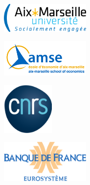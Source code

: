 \begin{center} %
	\begin{minipage}[c]{.23\linewidth}
		\centering\includegraphics[width=12em]{logo/amu.png} 
	\end{minipage}\hfill%
	\begin{minipage}[c]{.23\linewidth}
		\centering\includegraphics[width=12em]{logo/amse.png}
	\end{minipage}\hfill%
	\begin{minipage}[c]{.23\linewidth}
		\centering\includegraphics[height=7em]{logo/cnrs.png} 
	\end{minipage}\hfill%
	\begin{minipage}[c]{.23\linewidth}
		\centering\includegraphics[width=12em]{logo/bdf.png} 
	\end{minipage}
\end{center}

\restoregeometry